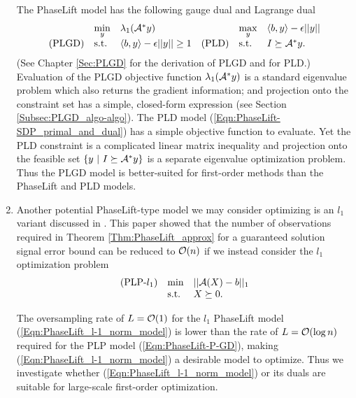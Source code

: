 \begin{enumerate}
The PhaseLift model has the following gauge dual and Lagrange dual
\begin{equation} 			\label{Eqn:PhaseLift-SDP_primal_and_dual}
\begin{array}{llllll}
	&	\min\limits_{\substack{y}}
		&	\lambda_1({\mathcal A}^* y)
				&&	\max\limits_{\substack{y}}
					&	\langle b, y \rangle - \epsilon ||y||
						\\
\textnormal{(PLGD)}
	&	\textnormal{s.t.}
		&	\langle b, y \rangle - \epsilon ||y|| \geq 1
			&\textnormal{(PLD)}
				&	\textnormal{s.t.}
					&	I \succeq {\mathcal A}^*y.
\end{array}
\end{equation}
(See Chapter \ref{Sec:PLGD} for the derivation of PLGD and  \cite[Chapter 5]{boyd2004convex} for PLD.)  Evaluation of the PLGD objective function $\lambda_1({\mathcal A}^*y)$ is a standard eigenvalue problem which also returns the gradient information; and projection onto the constraint set has a simple, closed-form expression (see Section \ref{Subsec:PLGD_algo-algo}).  The PLD model (\ref{Eqn:PhaseLift-SDP_primal_and_dual}) has a simple objective function to evaluate.  Yet the PLD constraint is a complicated linear matrix inequality and projection onto the feasible set $\{ y \ | \ I \succeq {\mathcal A}^*y \}$ is a separate eigenvalue optimization problem.  Thus the PLGD model is better-suited for first-order methods than the PhaseLift and PLD models.




\item


Another potential PhaseLift-type model we may consider optimizing is an $l_1$ variant discussed in \cite{candes2014solving}.  This paper showed that the number of observations required in Theorem \ref{Thm:PhaseLift_approx} for a guaranteed solution signal error bound can be reduced to ${\mathcal O}(n)$ if we instead consider the $l_1$ optimization problem
\begin{equation} 			\label{Eqn:PhaseLift_l-1_norm_model}
\begin{array}{lll}
(\textnormal{PLP-}l_1)	
&	\min
		& ||{\mathcal A}(X) - b||_1
			\\
&	\textnormal{s.t.}
		&	X \succeq 0.
\end{array}
\end{equation}


The oversampling rate of $L = {\mathcal O}(1)$ for the $l_1$ PhaseLift model (\ref{Eqn:PhaseLift_l-1_norm_model}) is lower than the rate of $L = {\mathcal O}(\log n)$ required for the PLP model (\ref{Eqn:PhaseLift-P-GD}), making (\ref{Eqn:PhaseLift_l-1_norm_model}) a desirable model to optimize.  Thus we investigate whether (\ref{Eqn:PhaseLift_l-1_norm_model}) or its duals are suitable for large-scale first-order optimization.



\end{enumerate}
